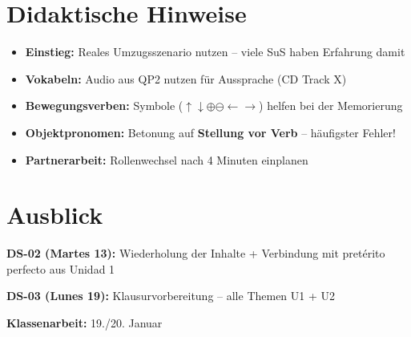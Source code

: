 \documentclass[11pt, a4paper]{article}
\begin{document}

\section*{Didaktische Hinweise}

\begin{itemize}[leftmargin=1.5em]
    \item \textbf{Einstieg:} Reales Umzugsszenario nutzen -- viele SuS haben Erfahrung damit
    \item \textbf{Vokabeln:} Audio aus QP2 nutzen für Aussprache (CD Track X)
    \item \textbf{Bewegungsverben:} Symbole ($\uparrow\downarrow\oplus\ominus\leftarrow\rightarrow$) helfen bei der Memorierung
    \item \textbf{Objektpronomen:} Betonung auf \textbf{Stellung vor Verb} -- häufigster Fehler!
    \item \textbf{Partnerarbeit:} Rollenwechsel nach 4 Minuten einplanen
\end{itemize}


\section*{Ausblick}

\textbf{DS-02 (Martes 13):} Wiederholung der Inhalte + Verbindung mit pretérito perfecto aus Unidad 1

\textbf{DS-03 (Lunes 19):} Klausurvorbereitung -- alle Themen U1 + U2

\textbf{Klassenarbeit:} 19./20. Januar
\end{document}
